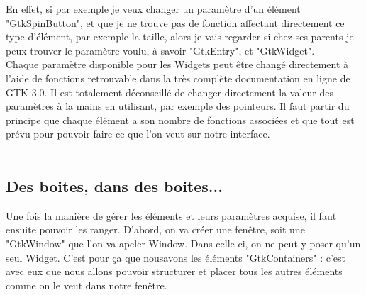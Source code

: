 \documentclass[11pt,french,a4paper]{report}
\begin{document}
En effet, si par exemple je veux changer un paramètre d'un élément "GtkSpinButton", et que je ne trouve pas de fonction 
affectant directement ce type d'élément, par exemple la taille, alors je vais regarder si chez ses parents je peux trouver 
le paramètre voulu, à savoir "GtkEntry", et "GtkWidget". \\

Chaque paramètre disponible pour les Widgets peut être changé directement à l'aide de fonctions retrouvable dans la très complète 
documentation en ligne de GTK 3.0. Il est totalement déconseillé de changer directement la valeur des paramètres à la mains 
en utilisant, par exemple des pointeurs. Il faut partir du principe que chaque élément a son nombre de fonctions associées 
et que tout est prévu pour pouvoir faire ce que l'on veut sur notre interface. \\ 
\\

        \subsection{Des boites, dans des boites...}
Une fois la manière de gérer les éléments et leurs paramètres acquise, il faut ensuite pouvoir les ranger. 
D'abord, on va créer une fenêtre, soit une "GtkWindow" que l'on va apeler Window. Dans celle-ci, on ne peut y poser qu'un seul Widget. 
C'est pour ça que nousavons les éléments "GtkContainers" : c'est avec eux que nous allons pouvoir structurer et placer tous les autres éléments 
comme on le veut dans notre fenêtre. \\
\end{document}

